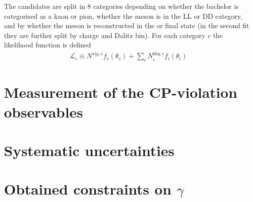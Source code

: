 The candidates are split in 8 categories depending on whether the bachelor is categorised as a kaon or pion, whether the \KS meson is in the LL or DD category, and by whether the \D meson is reconstructed in the \Kspipi or \KsKK final state (in the second fit they are further split by charge and Dalitz bin). For each category $c$ the likelihood function is defined
\begin{align}
    \mathcal L_c \equiv N^{sig, c} f_s(\theta_s) + \sum_i N_i^{bkg, c} f_i(\theta_i)
\end{align}


\section{Measurement of the CP-violation observables} %
\label{sec:measurement_of_the_cp_violation_observables}


\section{Systematic uncertainties} %
\label{sec:systematic_uncertainties}


\section{\texorpdfstring{Obtained constraints on $\gamma$}{Obtained constraints on gamma}} %
\label{sec:constraints_on_gamma}




